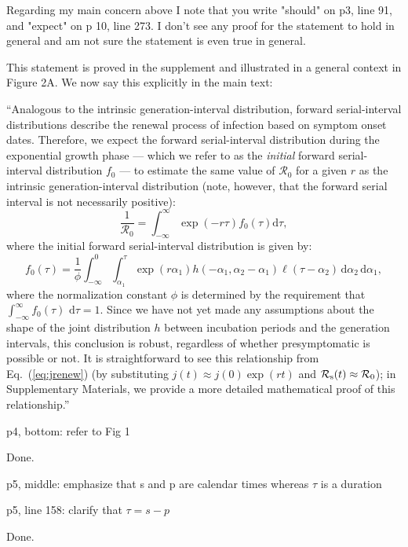 \documentclass[12pt]{article}
\newcommand{\eref}[1]{Eq.~(\ref{eq:#1})}
\newcommand{\Rx}[1]{\ensuremath{{\cal R}_{#1}}}
\newcommand{\Ro}{\ensuremath{{\mathcal R}_{0}}\xspace}
\newcommand{\Rs}{\Rx{\mathrm{s}}}
\newcommand{\dd}[1]{\ensuremath{\, \mathrm{d}#1}}
\newcommand{\dtau}{\dd{\tau}}
\newcommand{\revtext}{\textsf}
\newcommand{\pinf}{\ensuremath{\alpha_1}} %
\newcommand{\sinf}{\ensuremath{\alpha_2}} %
\newcommand{\idist}{\ell} %
\begin{document}
\revtext{Regarding my main concern above I note that you write "should" on p3, line 91, and "expect" on p 10, line 273. I don't see any proof for the statement to hold in general and am not sure the statement is even true in general.}

This statement is proved in the supplement and illustrated in a general context in Figure 2A. We now say this explicitly in the main text:

``Analogous to the intrinsic generation-interval distribution, 
forward serial-interval distributions describe the renewal process of infection based on symptom onset dates.
Therefore, we expect the forward serial-interval distribution during the exponential growth phase --- which we refer to as the \emph{initial} forward serial-interval distribution $f_0$ --- to estimate the same value of \Ro for a given $r$ as the intrinsic generation-interval distribution (note, however, that the forward serial interval is not necessarily positive):
\begin{equation}
\frac{1}{\Ro} = \int_{-\infty}^\infty \exp(-r\tau) f_{0}(\tau) \mathrm{d} \tau,
\label{eq:Rforward}
\end{equation}
where the initial forward serial-interval distribution is given by:
\begin{equation}
f_{0}(\tau) = \frac{1}{\phi} \int_{-\infty}^{0} \int_{\pinf}^{\tau} \exp(r \pinf) h(-\pinf, \sinf - \pinf) \idist(\tau - \sinf) \, \mathrm{d}\sinf\,\mathrm{d}\pinf,
\label{eq:initialSI}
\end{equation}
where the normalization constant $\phi$ is determined by the
requirement that $\int_{-\infty}^\infty f_{0}(\tau)\,\dtau=1$.
Since we have not yet made any assumptions about the shape of the joint distribution $h$ between incubation periods and the generation intervals, this conclusion is robust, regardless of whether presymptomatic is possible or not.
It is straightforward to see this relationship from \eref{jrenew} (by substituting $j(t) \approx j(0) \exp(rt)$ and $\Rs(t) \approx \Ro$);
in Supplementary Materials, we provide a more detailed mathematical proof of this relationship.''

\revtext{p4, bottom: refer to Fig 1 }

Done.

\revtext{p5, middle: emphasize that s and p are calendar times whereas $\tau$ is a duration }

\revtext{p5, line 158: clarify that $\tau = s-p$}

Done.
\end{document}
